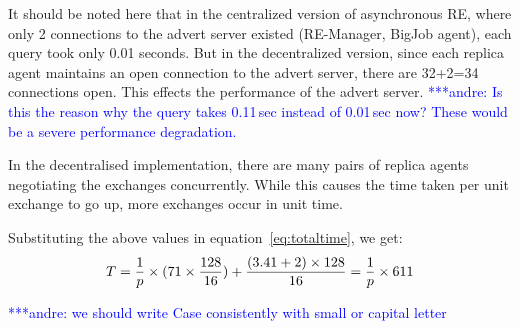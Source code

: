 \documentclass{rspublic}
\newcommand{\jhanote}[1]{ {\textcolor{red} { ***shantenu: #1 }}}
\newcommand{\alnote}[1]{ {\textcolor{blue} { ***andre: #1 }}}
\newcommand{\alnote}[1]{}
\newcommand{\jhanote}[1]{}
\begin{document}
It should be noted here that in the centralized version of
asynchronous RE, where only 2 connections to the advert server existed
(RE-Manager, BigJob agent), each query took only 0.01 seconds. But in
the decentralized version, since each replica agent maintains an open
connection to the advert server, there are 32+2=34 connections
open. This effects the performance of the advert server. \alnote{Is this the reason why
the query takes 0.11\,sec instead of 0.01\,sec now? These would be a severe performance
degradation.}

In the decentralised implementation, there are many pairs of
replica agents negotiating the exchanges concurrently. While this
causes the time taken per unit exchange to go up, more exchanges occur
in unit time.


Substituting the above values in equation~\ref{eq:totaltime}, we get:
\begin{eqnarray}
T=  {1 \over p} \times {{(71\times {128\over 16}}) + {(3.41+2)\times 128\over 16}} = {1 \over p} \times 611
\label{eq:decent}
\end{eqnarray}




\alnote{we should write Case consistently with small or capital letter}
\end{document}

